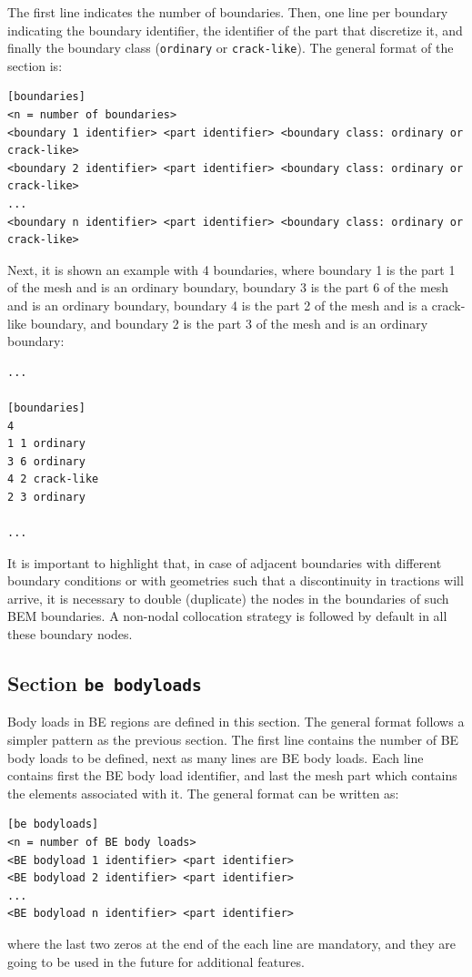 \documentclass[a4paper,fleqn]{book}
\begin{document}
The first line indicates the number of boundaries. Then, one line per boundary indicating the boundary identifier, the identifier of the part that discretize it, and finally the boundary class (\texttt{ordinary} or \texttt{crack-like}). The general format of the section is:
\begin{Verbatim}[frame=single, fontsize=\small, label={general format of section [boundaries]}]
[boundaries]
<n = number of boundaries>
<boundary 1 identifier> <part identifier> <boundary class: ordinary or crack-like>
<boundary 2 identifier> <part identifier> <boundary class: ordinary or crack-like>
...
<boundary n identifier> <part identifier> <boundary class: ordinary or crack-like>
\end{Verbatim} 
Next, it is shown an example with 4 boundaries, where boundary 1 is the part 1 of the mesh and is an ordinary boundary, boundary 3 is the part 6 of the mesh and is an ordinary boundary, boundary 4 is the part 2 of the mesh and is a crack-like boundary, and boundary 2 is the part 3 of the mesh and is an ordinary boundary:
\begin{Verbatim}[frame=single, fontsize=\small, label=input.dat]
...

[boundaries]
4
1 1 ordinary 
3 6 ordinary
4 2 crack-like
2 3 ordinary

...
\end{Verbatim} 

It is important to highlight that, in case of adjacent boundaries with different boundary conditions or with geometries such that a discontinuity in tractions will arrive, it is necessary to double (duplicate) the nodes in the boundaries of such BEM boundaries. A non-nodal collocation strategy is followed by default in all these boundary nodes.

\subsection{Section \texttt{be bodyloads}}
\label{sec:be_bodyloads}

Body loads in BE regions are defined in this section. The general format follows a simpler pattern as the previous section. The first line contains the number of BE body loads to be defined, next as many lines are BE body loads. Each line contains first the BE body load identifier, and last the mesh part which contains the elements associated with it. The general format can be written as:
\begin{Verbatim}[frame=single, fontsize=\small, label={general format of section [fe subregions]}]
[be bodyloads]
<n = number of BE body loads>
<BE bodyload 1 identifier> <part identifier>
<BE bodyload 2 identifier> <part identifier>
...
<BE bodyload n identifier> <part identifier>
\end{Verbatim}
where the last two zeros at the end of the each line are mandatory, and they are going to be used in the future for additional features.
\end{document}
